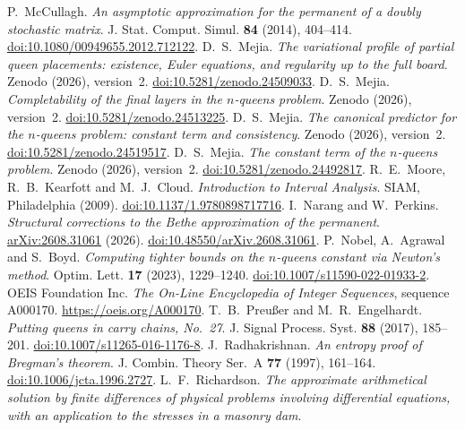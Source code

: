 P.~McCullagh.
\emph{An asymptotic approximation for the permanent of a doubly stochastic matrix}.
J. Stat. Comput. Simul. \textbf{84} (2014), 404--414.
\href{https://doi.org/10.1080/00949655.2012.712122}{doi:10.1080/00949655.2012.712122}.
 D.~S.~Mejia. \emph{The variational profile of partial queen placements: existence,
Euler equations, and regularity up to the full board}. Zenodo (2026), version~2.
\href{https://doi.org/10.5281/zenodo.24509033}{doi:10.5281/zenodo.24509033}.
 D.~S.~Mejia. \emph{Completability of the final layers in the $n$-queens problem}.
Zenodo (2026), version~2.
\href{https://doi.org/10.5281/zenodo.24513225}{doi:10.5281/zenodo.24513225}.
 D.~S.~Mejia. \emph{The canonical predictor for the $n$-queens problem: constant term
and consistency}. Zenodo (2026), version~2.
\href{https://doi.org/10.5281/zenodo.24519517}{doi:10.5281/zenodo.24519517}.
 D.~S.~Mejia. \emph{The constant term of the $n$-queens problem}. Zenodo (2026), version~2.
\href{https://doi.org/10.5281/zenodo.24492817}{doi:10.5281/zenodo.24492817}.
\label{bib:moore}
R.~E.~Moore, R.~B.~Kearfott and M.~J.~Cloud.
\emph{Introduction to Interval Analysis}.
SIAM, Philadelphia (2009).
\href{https://doi.org/10.1137/1.9780898717716}{doi:10.1137/1.9780898717716}.
I.~Narang and W.~Perkins.
\emph{Structural corrections to the Bethe approximation of the permanent}.
\href{https://arxiv.org/abs/2608.31061}{arXiv:2608.31061} (2026).
\href{https://doi.org/10.48550/arXiv.2608.31061}{doi:10.48550/arXiv.2608.31061}.
P.~Nobel, A.~Agrawal and S.~Boyd.
\emph{Computing tighter bounds on the $n$-queens constant via Newton's method}.
Optim. Lett. \textbf{17} (2023), 1229--1240.
\href{https://doi.org/10.1007/s11590-022-01933-2}{doi:10.1007/s11590-022-01933-2}.
OEIS Foundation Inc.
\emph{The On-Line Encyclopedia of Integer Sequences}, sequence A000170.
\url{https://oeis.org/A000170}.
T.~B.~Preußer and M.~R.~Engelhardt.
\emph{Putting queens in carry chains, No.~27}.
J. Signal Process. Syst. \textbf{88} (2017), 185--201.
\href{https://doi.org/10.1007/s11265-016-1176-8}{doi:10.1007/s11265-016-1176-8}.
J.~Radhakrishnan.
\emph{An entropy proof of Bregman's theorem}.
J. Combin. Theory Ser.~A \textbf{77} (1997), 161--164.
\href{https://doi.org/10.1006/jcta.1996.2727}{doi:10.1006/jcta.1996.2727}.
L.~F.~Richardson.
\emph{The approximate arithmetical solution by finite differences of physical problems involving
differential equations, with an application to the stresses in a masonry dam}.
